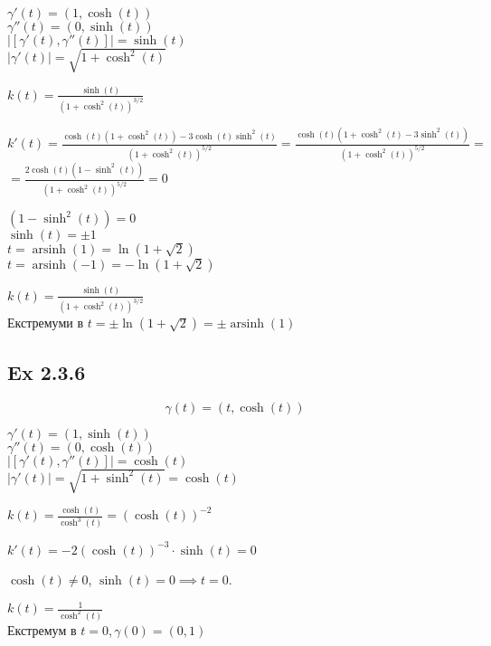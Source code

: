 \documentclass[10pt, a4paper]{article} %
\begin{document}
$\gamma'(t) = (1, \cosh(t))$\\
$\gamma''(t) = (0, \sinh(t))$\\
$|[\gamma'(t), \gamma''(t)]| = \sinh(t)$\\
$|\gamma'(t)| = \sqrt{1+\cosh^2(t)}$

$k(t) = \frac{\sinh(t)}{(1 + \cosh^2(t))^{3/2}}$

$k'(t) = \frac{\cosh(t)(1+\cosh^2(t))-3\cosh(t)\sinh^2(t)}{(1+\cosh^2(t))^{5/2}} 
= \frac{\cosh(t)(1+\cosh^2(t)-3\sinh^2(t))}{(1+\cosh^2(t))^{5/2}}=$
$= \frac{2\cosh(t)(1-\sinh^2(t))}{(1+\cosh^2(t))^{5/2}} = 0$

$(1-\sinh^2(t)) = 0$\\
$\sinh(t) = \pm 1$\\
$t = \operatorname{arsinh}(1) = \ln(1+\sqrt{2})$\\
$t = \operatorname{arsinh}(-1) = -\ln(1+\sqrt{2})$\\

\begin{mdframed}[backgroundcolor=green!20]
    $k(t) = \frac{\sinh(t)}{(1 + \cosh^2(t))^{3/2}}$\\
    Екстремуми в $t = \pm\ln(1+\sqrt{2}) = \pm\operatorname{arsinh}(1)$
\end{mdframed}


\subsection*{Ex 2.3.6}
\[\gamma(t) = (t, \cosh(t))\]

$\gamma'(t) = (1, \sinh(t))$\\
$\gamma''(t) = (0, \cosh(t))$\\
$|[\gamma'(t), \gamma''(t)]| = \cosh(t)$\\
$|\gamma'(t)| = \sqrt{1+\sinh^2(t)} = \cosh(t)$

$k(t) = \frac{\cosh(t)}{\cosh^3(t)} = (\cosh(t))^{-2}$

$k'(t) = -2(\cosh(t))^{-3}\cdot \sinh(t) = 0$

$\cosh(t) \ne 0$, $\sinh(t) = 0 \implies t = 0$.

\begin{mdframed}[backgroundcolor=green!20]
    $k(t) = \frac{1}{\cosh^2(t)}$\\
    Екстремум в $t = 0, \gamma(0) = (0,1)$
\end{mdframed}


\newpage
\end{document}
